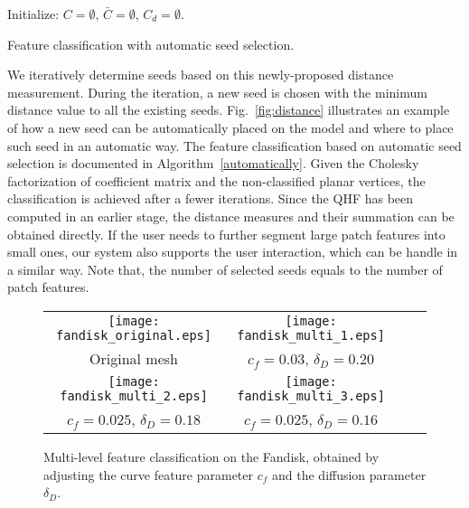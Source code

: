 \documentclass[10pt,journal,cspaper,compsoc]{IEEEtran}
\begin{document}
\begin{algorithm}[t]
\SetLine
{}
Initialize: $C=\emptyset$, $\bar{C}=\emptyset$, $C_{d}=\emptyset$.\\
\caption{Feature classification with automatic seed selection.}
\label{automatically}
\end{algorithm}

We iteratively determine seeds based on this newly-proposed distance
measurement. During the iteration, a new seed is chosen with the
minimum distance value to all the existing seeds.
Fig.~\ref{fig:distance} illustrates an example of how a new seed can
be automatically placed on the model and where to place such seed in
an automatic way. The feature classification based on automatic seed
selection is documented in Algorithm~\ref{automatically}. Given the
Cholesky factorization of coefficient matrix and the non-classified
planar vertices, the classification is achieved after a fewer
iterations. Since the QHF has been computed in an earlier stage, the
distance measures and their summation can be obtained directly.
If the user needs to further segment
large patch features into small ones, our system also supports the
user interaction, which can be handle in a similar way. Note that, the
number of selected seeds equals to the number of patch features.

\begin{figure}[t]
\begin{center}
\begin{tabular}{@{}c@{} @{}c@{} @{}c@{} @{}c@{}}
\texttt{[image: fandisk\_original.eps]} &
\texttt{[image: fandisk\_multi\_1.eps]} \\
 Original mesh &  $c_f=0.03$, $\delta_D=0.20$\\
\texttt{[image: fandisk\_multi\_2.eps]}&
\texttt{[image: fandisk\_multi\_3.eps]}\\
$c_f=0.025$, $\delta_D=0.18$ & $c_f=0.025$, $\delta_D=0.16$\\
\end{tabular}
\caption{Multi-level feature classification on the Fandisk,
obtained by adjusting the curve feature parameter $c_f$
and the diffusion parameter $\delta_D$.}
\label{fig:multi-level}
\end{center}
\end{figure}
\end{document}
